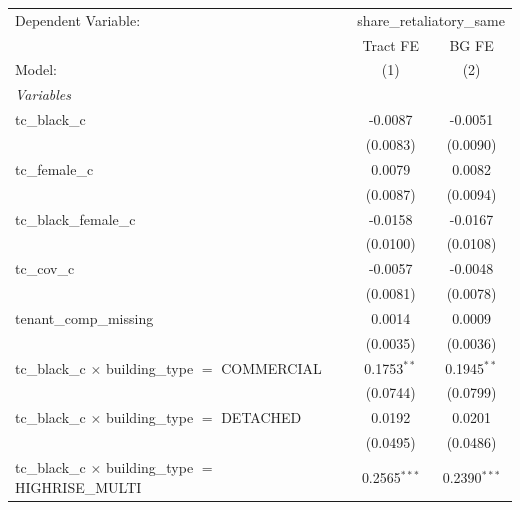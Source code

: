 \begingroup
\centering
\begin{tabular}{lcc}
   \tabularnewline \midrule \midrule
   Dependent Variable: & \multicolumn{2}{c}{share\_retaliatory\_same}\\
                                                                       & Tract FE       & BG FE \\   
   Model:                                                              & (1)            & (2)\\  
   \midrule
   \emph{Variables}\\
   tc\_black\_c                                                        & -0.0087        & -0.0051\\   
                                                                       & (0.0083)       & (0.0090)\\   
   tc\_female\_c                                                       & 0.0079         & 0.0082\\   
                                                                       & (0.0087)       & (0.0094)\\   
   tc\_black\_female\_c                                                & -0.0158        & -0.0167\\   
                                                                       & (0.0100)       & (0.0108)\\   
   tc\_cov\_c                                                          & -0.0057        & -0.0048\\   
                                                                       & (0.0081)       & (0.0078)\\   
   tenant\_comp\_missing                                               & 0.0014         & 0.0009\\   
                                                                       & (0.0035)       & (0.0036)\\   
   tc\_black\_c $\times$ building\_type $=$ COMMERCIAL                 & 0.1753$^{**}$  & 0.1945$^{**}$\\   
                                                                       & (0.0744)       & (0.0799)\\   
   tc\_black\_c $\times$ building\_type $=$ DETACHED                   & 0.0192         & 0.0201\\   
                                                                       & (0.0495)       & (0.0486)\\   
   tc\_black\_c $\times$ building\_type $=$ HIGHRISE\_MULTI            & 0.2565$^{***}$ & 0.2390$^{***}$\\   

\end{tabular}
